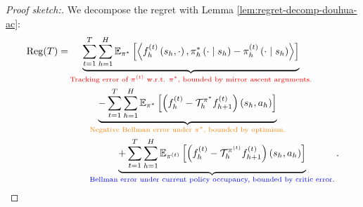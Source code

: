\begin{proof}[Proof sketch:]
We decompose the regret with Lemma \ref{lem:regret-decomp-douhua-ac}:
    \begin{align}\label{eqn:regret-decom-douhua}
    \operatorname{Reg}(T)
    = & \underbrace{\sum_{t=1}^T \sum_{h=1}^H \mathbb{E}_{\pi^*}\left[\left\langle f_h^{(t)}\left(s_h, \cdot\right), \pi_h^*\left(\cdot \mid s_h\right)-\pi_h^{(t)}\left(\cdot \mid s_h\right)\right\rangle\right]}_{\text{\textcolor{red}{Tracking error of $\pi^{(t)}$ w.r.t. $\pi^*$, bounded by mirror ascent arguments.}}}\nonumber \\ 
    &\qquad\underbrace{-\sum_{t=1}^T \sum_{h=1}^H\mathbb{E}_{\pi^*}\left[\left(f_h^{(t)}-{\mathcal{T}}_h^{\pi^{*}}f_{h+1}^{(t)}\right)\left(s_h, a_h\right)\right]}_{\text{\textcolor{orange}{Negative Bellman error under $\pi^*$, bounded by optimism.}}}\nonumber \\
    &\qquad\underbrace{+ \sum_{t=1}^T \sum_{h=1}^H\mathbb{E}_{\pi^{(t)}}\left[\left(f_h^{(t)}-{\mathcal{T}}_h^{\pi^{(t)}} f_{h+1}^{(t)}\right)\left(s_h, a_h\right)\right]}_{\text{\textcolor{blue}{Bellman error under current policy occupancy, bounded by critic error.}}}.
\end{align}
    


\end{proof}
